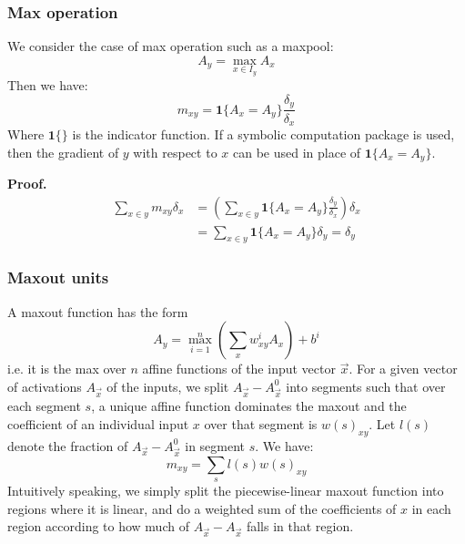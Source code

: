 \documentclass{article}
\begin{document}
\subsubsection{Max operation}

We consider the case of max operation such as a maxpool:
\begin{equation}
A_y = \max_{x \in I_y} A_x
\end{equation}
Then we have:
\begin{equation}
m_{xy} = \bm{1}\{A_x = A_y\}\frac{\delta_y}{\delta_x}
\end{equation}
Where $\bm{1}\{\}$ is the indicator function. If a symbolic computation package is used, then the gradient of $y$ with respect to $x$ can be used in place of $\bm{1}\{A_x = A_y\}$.

{\bf Proof.}
\begin{equation}
\begin{aligned}
\sum_{x \in y} m_{xy} \delta_x &= \left(\sum_{x \in y} \bm{1}\{A_x = A_y\}\frac{\delta_y}{\delta_x}\right)\delta_x\\ &= \sum_{x \in y} \bm{1}\{A_x = A_y\}\delta_y = \delta_y
\end{aligned}
\end{equation}

\subsubsection{Maxout units}
A maxout function has the form
\begin{equation}
A_y = \max_{i = 1}^n \left(\sum_x w_{xy}^i A_x\right) + b^i
\end{equation}
i.e. it is the max over $n$ affine functions of the input vector $\vec{x}$. For a given vector of activations $A_{\vec{x}}$ of the inputs, we split $A_{\vec{x}} - A_{\vec{x}}^0$ into segments such that over each segment $s$, a unique affine function dominates the maxout and the coefficient of an individual input $x$ over that segment is $w(s)_{xy}$. Let $l(s)$ denote the fraction of $A_{\vec{x}} - A_{\vec{x}}^0$ in segment $s$. We have:
\begin{equation}
m_{xy} = \sum_s l(s)w(s)_{xy}
\end{equation}
Intuitively speaking, we simply split the piecewise-linear maxout function into regions where it is linear, and do a weighted sum of the coefficients of $x$ in each region according to how much of $A_{\vec{x}} - A_{\vec{x}}$ falls in that region.
\end{document}
